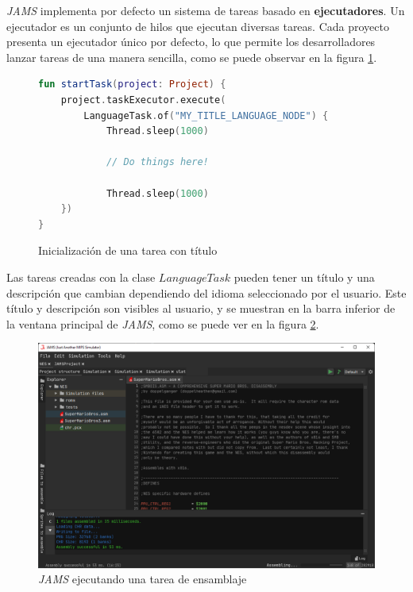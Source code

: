  \textit{JAMS} implementa por defecto un
sistema de tareas basado en \textbf{ejecutadores}.
Un ejecutador es un conjunto de hilos que ejecutan
diversas tareas.
Cada proyecto presenta un ejecutador único por defecto,
lo que permite los desarrolladores lanzar tareas de una
manera sencilla, como se puede observar en la figura \ref{fig:tasks-execution}.

\begin{figure}[h]
    \centering
    \begin{lstlisting}[frame=single,label={lst:tasks-execution},language=Kotlin]
fun startTask(project: Project) {
    project.taskExecutor.execute(
        LanguageTask.of("MY_TITLE_LANGUAGE_NODE") {
            Thread.sleep(1000)

            // Do things here!

            Thread.sleep(1000)
    })
}
    \end{lstlisting}
    \caption{Inicialización de una tarea con título}
    \label{fig:tasks-execution}
\end{figure}

 Las tareas creadas con la clase $LanguageTask$
pueden tener un título y una descripción que cambian dependiendo
del idioma seleccionado por el usuario.
Este título y descripción son visibles al usuario, y se muestran
en la barra inferior de la ventana principal de \textit{JAMS},
como se puede ver en la figura \ref{fig:jams-assembling}.

\begin{figure}[h]
    \centering
    \includegraphics[width=\textwidth]{images/tecnologias/jams-assembling}
    \caption{\textit{JAMS} ejecutando una tarea de ensamblaje}
    \label{fig:jams-assembling}
\end{figure}